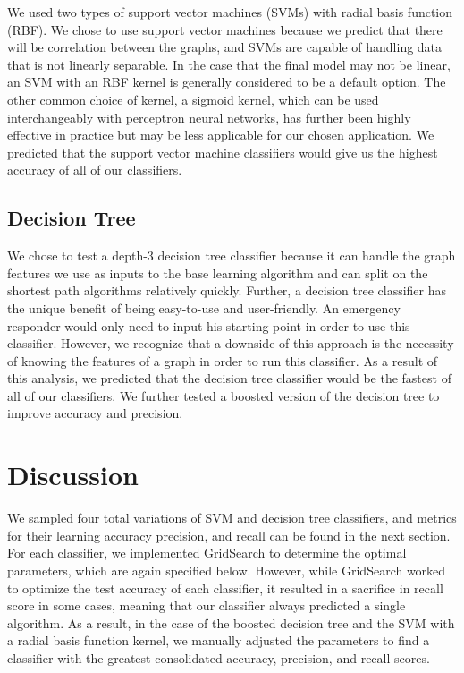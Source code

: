 \documentclass{article}
\begin{document}
We used two types of support vector machines (SVMs) with radial basis function (RBF). We chose to use support vector machines because we predict that there will be correlation between the graphs, and SVMs are capable of handling data that is not linearly separable. In the case that the final model may not be linear, an SVM with an RBF kernel is generally considered to be a default option. The other common choice of kernel, a sigmoid kernel, which can be used interchangeably with perceptron neural networks, has further been highly effective in practice but may be less applicable for our chosen application. We predicted that the support vector machine classifiers would give us the highest accuracy of all of our classifiers.

\subsection{Decision Tree}

We chose to test a depth-3 decision tree classifier because it can handle the graph features we use as inputs to the base learning algorithm and can split on the shortest path algorithms relatively quickly. Further, a decision tree classifier has the unique benefit of being easy-to-use and user-friendly. An emergency responder would only need to input his starting point in order to use this classifier. However, we recognize that a downside of this approach is the necessity of knowing the features of a graph in order to run this classifier. As a result of this analysis, we predicted that the decision tree classifier would be the fastest of all of our classifiers. We further tested a boosted version of the decision tree to improve accuracy and precision.

\section{Discussion}

We sampled four total variations of SVM and decision tree classifiers, and metrics for their learning accuracy precision, and recall can be found in the next section. For each classifier, we implemented GridSearch to determine the optimal parameters, which are again specified below. However, while GridSearch worked to optimize the test accuracy of each classifier, it resulted in a sacrifice in recall score in some cases, meaning that our classifier always predicted a single algorithm. As a result, in the case of the boosted decision tree and the SVM with a radial basis function kernel, we manually adjusted the parameters to find a classifier with the greatest consolidated accuracy, precision, and recall scores.
\end{document}
